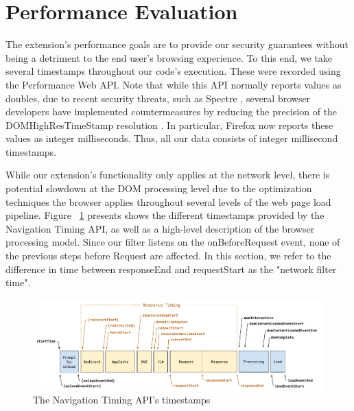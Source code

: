 \section{Performance Evaluation}
The extension's performance goals are to provide our security guarantees without being a detriment to the end user's browsing experience. To this end, we take several timestamps throughout our code's execution. These were recorded using the Performance Web API. Note that while this API normally reports values as doubles, due to recent security threats, such as Spectre \cite{DBLP:journals/corr/abs-1801-01203}, several browser developers have implemented countermeasures by reducing the precision of the DOMHighResTimeStamp resolution \cite{reducetimeprecision,resolutionconsiderations}. In particular, Firefox now reports these values as integer milliseconds. Thus, all our data consists of integer millisecond timestamps.

While our extension's functionality only applies at the network level, there is potential slowdown at the DOM processing level due to the optimization techniques the browser applies throughout several levels of the web page load pipeline. Figure ~\ref{fig:navigationtiming} presents shows the different timestamps provided by the Navigation Timing API, as well as a high-level description of the browser processing model. Since our filter listens on the onBeforeRequest event, none of the previous steps before Request are affected. In this section, we refer to the difference in time between responseEnd and requestStart as the "network filter time".

\begin{figure}[h]
 \includegraphics[scale=0.32]{img/timestamp-diagram}
 \caption{The Navigation Timing API's timestamps}
 \label{fig:navigationtiming}
 \end{figure}


